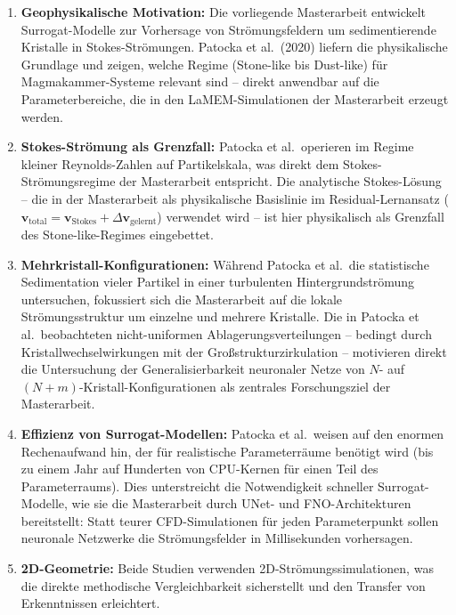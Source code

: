 \documentclass[a4paper,12pt]{article}
\begin{document}
\begin{enumerate}
    \item \textbf{Geophysikalische Motivation:} Die vorliegende Masterarbeit entwickelt Surrogat-Modelle zur Vorhersage von Str\"omungsfeldern um sedimentierende Kristalle in Stokes-Str\"omungen. Patocka et al.\ (2020) liefern die physikalische Grundlage und zeigen, welche Regime (Stone-like bis Dust-like) f\"ur Magmakammer-Systeme relevant sind -- direkt anwendbar auf die Parameterbereiche, die in den LaMEM-Simulationen der Masterarbeit erzeugt werden.

    \item \textbf{Stokes-Str\"omung als Grenzfall:} Patocka et al.\ operieren im Regime kleiner Reynolds-Zahlen auf Partikelskala, was direkt dem Stokes-Str\"omungsregime der Masterarbeit entspricht. Die analytische Stokes-L\"osung -- die in der Masterarbeit als physikalische Basislinie im Residual-Lernansatz ($\mathbf{v}_\mathrm{total} = \mathbf{v}_\mathrm{Stokes} + \Delta \mathbf{v}_\mathrm{gelernt}$) verwendet wird -- ist hier physikalisch als Grenzfall des Stone-like-Regimes eingebettet.

    \item \textbf{Mehrkristall-Konfigurationen:} W\"ahrend Patocka et al.\ die statistische Sedimentation vieler Partikel in einer turbulenten Hintergrundstr\"omung untersuchen, fokussiert sich die Masterarbeit auf die lokale Str\"omungsstruktur um einzelne und mehrere Kristalle. Die in Patocka et al.\ beobachteten nicht-uniformen Ablagerungsverteilungen -- bedingt durch Kristallwechselwirkungen mit der Gro\ss{}strukturzirkulation -- motivieren direkt die Untersuchung der Generalisierbarkeit neuronaler Netze von $N$- auf $(N{+}m)$-Kristall-Konfigurationen als zentrales Forschungsziel der Masterarbeit.

    \item \textbf{Effizienz von Surrogat-Modellen:} Patocka et al.\ weisen auf den enormen Rechenaufwand hin, der f\"ur realistische Parameterr\"aume ben\"otigt wird (bis zu einem Jahr auf Hunderten von CPU-Kernen f\"ur einen Teil des Parameterraums). Dies unterstreicht die Notwendigkeit schneller Surrogat-Modelle, wie sie die Masterarbeit durch UNet- und FNO-Architekturen bereitstellt: Statt teurer CFD-Simulationen f\"ur jeden Parameterpunkt sollen neuronale Netzwerke die Str\"omungsfelder in Millisekunden vorhersagen.

    \item \textbf{2D-Geometrie:} Beide Studien verwenden 2D-Str\"omungssimulationen, was die direkte methodische Vergleichbarkeit sicherstellt und den Transfer von Erkenntnissen erleichtert.
\end{enumerate}
\end{document}

